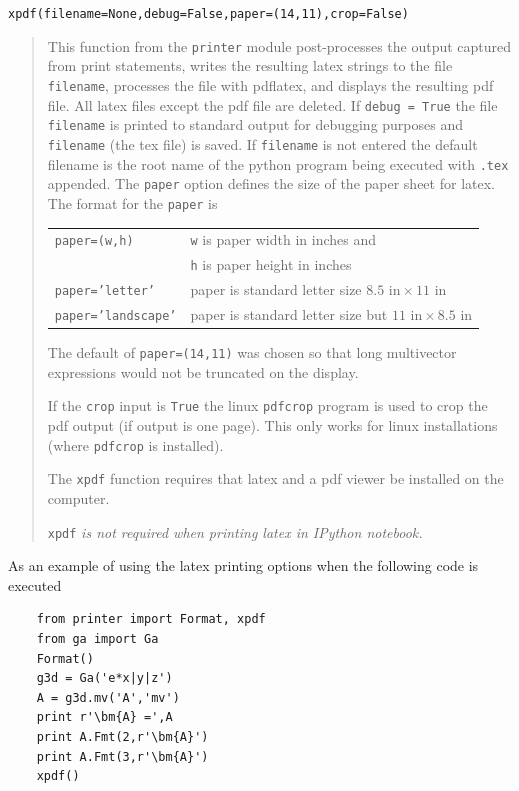 \documentclass[12pt]{report}
\newcommand{\bm}[1]{\boldsymbol{#1}}
\newcommand{\T}[1]{\texttt{#1}}
\begin{document}
\T{xpdf(filename=None,debug=False,paper=(14,11),crop=False)}
\begin{quote}
   This function from the \T{printer} module post-processes the output captured from
   print statements, writes the resulting latex strings to the file \T{filename},
   processes the file with pdflatex, and displays the resulting pdf file.   All latex files except
   the pdf file are deleted. If \T{debug = True} the file \T{filename} is printed to
   standard output for debugging purposes and \T{filename} (the tex file) is saved.  If \T{filename} is not entered the default
   filename is the root name of the python program being executed with \T{.tex} appended.
   The \T{paper} option defines the size of the paper sheet for latex. The format for the  \T{paper} is

   \begin{center}
   \begin{tabular}{ll}
       \T{paper=(w,h)} & \T{w} is paper width in inches and \\
                       & \T{h} is paper height in inches \\
       \T{paper='letter'} & paper is standard letter size $8.5\mbox{ in}\times 11\mbox{ in}$ \\
       \T{paper='landscape'} & paper is standard letter size but $11\mbox{ in}\times 8.5\mbox{ in}$
   \end{tabular}
   \end{center}

   The default of \T{paper=(14,11)} was chosen so that long multivector expressions would not be truncated on the display.

   If the \T{crop} input is \T{True} the linux \T{pdfcrop} program is used to crop the pdf output (if output is one page).  This only works
   for linux installations (where \T{pdfcrop} is installed).

   The \T{xpdf} function requires that latex and a pdf viewer be installed on
   the computer.

   \T{xpdf} \emph{is not required when printing latex in IPython notebook.}
\end{quote}

As an example of using the latex printing options when the following code is
executed

\begin{lstlisting}
    from printer import Format, xpdf
    from ga import Ga
    Format()
    g3d = Ga('e*x|y|z')
    A = g3d.mv('A','mv')
    print r'\bm{A} =',A
    print A.Fmt(2,r'\bm{A}')
    print A.Fmt(3,r'\bm{A}')
    xpdf()
\end{lstlisting}
\end{document}
